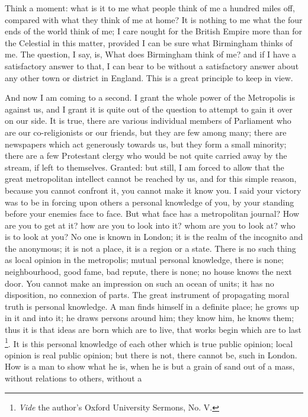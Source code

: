 Think a
moment: what is it to me what people think of me a
hundred miles off, compared with what they think of me at
home? It is nothing to me what the four ends of the world
think of me; I care nought for the British Empire more
than for the Celestial in this matter, provided I can be
sure what Birmingham thinks of me. The question, I say,
is, What does Birmingham think of me? and if I have a
satisfactory answer to that, I can bear to be without a
satisfactory answer about any other town or district in
England. This is a great principle to keep in view.

And now I am coming to a second. I grant the whole
power of the Metropolis is against us, and I grant it is
quite out of the question to attempt to gain it over on
our side. It is true, there are various individual
members of Parliament who are our co-religionists or our
friends, but they are few among many; there are
newspapers which act generously towards us, but they form
a small minority; there are a few Protestant clergy who
would be not quite carried away by the stream, if left to
themselves. Granted: but still, I am forced to allow that
the great metropolitan intellect cannot be reached by us,
and for this simple reason, because you cannot confront
it, you cannot make it know you. I said your victory was
to be in forcing upon others a personal knowledge of you,
by your standing before your enemies face to face. But
what face has a metropolitan journal? How are you to get
at it? how are you to look into it? whom are you to look
at? who is to look at you? No one is known in London; it
is the realm of the incognito and the anonymous; it is
not a place, it is a region or a state. There is no such
thing as local opinion in the metropolis; mutual personal
knowledge, there is none; neighbourhood, good fame, bad
repute, there is none; no house knows the next door. You
cannot make an impression on such an ocean of units; it
has no disposition, no connexion of parts. The great
instrument of propagating moral truth is personal
knowledge. A man finds himself in a definite place; he
grows up in it and into it; he draws persons around him;
they know him, he knows them; thus it is that ideas are
born which are to live, that works begin which are to last \footnote{\emph{Vide} the author's
Oxford University Sermons, No. V.}.
It is this personal knowledge of each other which is true
public opinion; local opinion is real public opinion; but
there is not, there cannot be, such in London. How is a
man to show what he is, when he is but a grain of sand
out of a mass, without relations to others, without a
